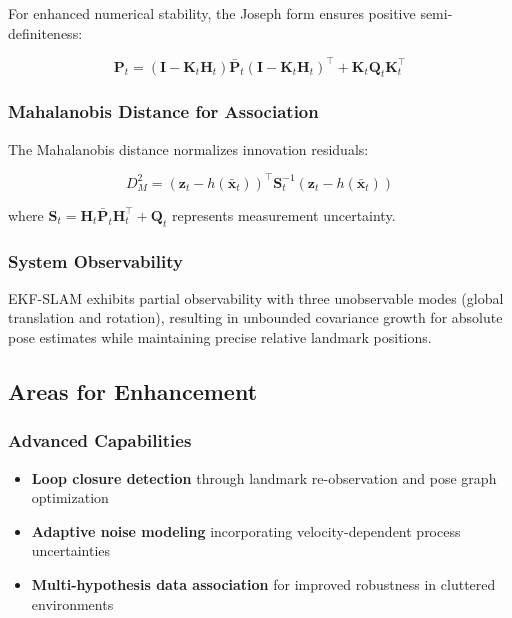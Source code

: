 \documentclass[12pt,a4paper]{article}
\newcommand{\state}{\bm{x}}
\newcommand{\measurement}{\bm{z}}
\newcommand{\covariance}{\bm{P}}
\newcommand{\kalman}{\bm{K}}
\newcommand{\noise}{\bm{Q}}
\begin{document}
For enhanced numerical stability, the Joseph form ensures positive semi-definiteness:

\begin{equation}
    \covariance_t = (\bm{I} - \kalman_t \bm{H}_t) \bar{\covariance}_t (\bm{I} - \kalman_t \bm{H}_t)^\top + \kalman_t \noise_t \kalman_t^\top
\end{equation}

\subsubsection{Mahalanobis Distance for Association}

The Mahalanobis distance normalizes innovation residuals:

\begin{equation}
    D_M^2 = (\measurement_t - h(\bar{\state}_t))^\top \bm{S}_t^{-1} (\measurement_t - h(\bar{\state}_t))
\end{equation}

where $\bm{S}_t = \bm{H}_t \bar{\covariance}_t \bm{H}_t^\top + \noise_t$ represents measurement uncertainty.

\subsubsection{System Observability}

EKF-SLAM exhibits partial observability with three unobservable modes (global translation and rotation), resulting in unbounded covariance growth for absolute pose estimates while maintaining precise relative landmark positions.

\subsection{Areas for Enhancement}

\subsubsection{Advanced Capabilities}
\begin{itemize}
    \item \textbf{Loop closure detection} through landmark re-observation and pose graph optimization
    \item \textbf{Adaptive noise modeling} incorporating velocity-dependent process uncertainties
    \item \textbf{Multi-hypothesis data association} for improved robustness in cluttered environments
\end{itemize}
\end{document}
